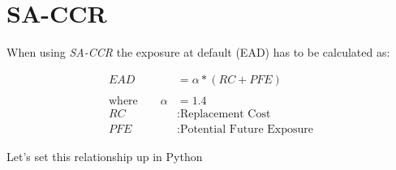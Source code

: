     

    
    \hypertarget{sa-ccr}{%
\section{SA-CCR}\label{sa-ccr}}

    When using \emph{SA-CCR} the exposure at default (EAD) has to be
calculated as:

\begin{align*}
EAD &= \alpha * (RC + PFE)\\
\\
\text{where} \qquad \alpha&=1.4 \\
RC&: \text{Replacement Cost} \\
PFE&: \text{Potential Future Exposure}
\end{align*}

Let's set this relationship up in Python

